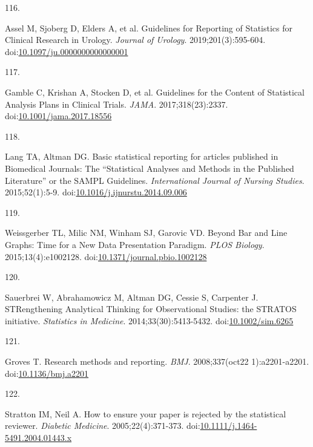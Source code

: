 \documentclass[
]{book}
\newlength{\cslhangindent}
\newlength{\csllabelwidth}
\newlength{\cslentryspacingunit} %
\newenvironment{CSLReferences}[2] %
 {%
  \setlength{\parindent}{0pt}
  \ifodd #1
  \let\oldpar\par
  \def\par{\hangindent=\cslhangindent\oldpar}
  \fi
  \setlength{\parskip}{#2\cslentryspacingunit}
 }%
 {}
\newcommand{\CSLLeftMargin}[1]{\parbox[t]{\csllabelwidth}{#1}}
\newcommand{\CSLRightInline}[1]{\parbox[t]{\linewidth - \csllabelwidth}{#1}\break}
\begin{document}
\begin{CSLReferences}{0}{0}
\leavevmode{}%
\CSLLeftMargin{116. }%
\CSLRightInline{Assel M, Sjoberg D, Elders A, et al. Guidelines for Reporting of Statistics for Clinical Research in Urology. \emph{Journal of Urology}. 2019;201(3):595-604. doi:\href{https://doi.org/10.1097/ju.0000000000000001}{10.1097/ju.0000000000000001}}

\leavevmode{}%
\CSLLeftMargin{117. }%
\CSLRightInline{Gamble C, Krishan A, Stocken D, et al. Guidelines for the Content of Statistical Analysis Plans in Clinical Trials. \emph{JAMA}. 2017;318(23):2337. doi:\href{https://doi.org/10.1001/jama.2017.18556}{10.1001/jama.2017.18556}}

\leavevmode{}%
\CSLLeftMargin{118. }%
\CSLRightInline{Lang TA, Altman DG. Basic statistical reporting for articles published in Biomedical Journals: The {``}Statistical Analyses and Methods in the Published Literature{''} or the SAMPL Guidelines. \emph{International Journal of Nursing Studies}. 2015;52(1):5-9. doi:\href{https://doi.org/10.1016/j.ijnurstu.2014.09.006}{10.1016/j.ijnurstu.2014.09.006}}

\leavevmode{}%
\CSLLeftMargin{119. }%
\CSLRightInline{Weissgerber TL, Milic NM, Winham SJ, Garovic VD. Beyond Bar and Line Graphs: Time for a New Data Presentation Paradigm. \emph{PLOS Biology}. 2015;13(4):e1002128. doi:\href{https://doi.org/10.1371/journal.pbio.1002128}{10.1371/journal.pbio.1002128}}

\leavevmode{}%
\CSLLeftMargin{120. }%
\CSLRightInline{Sauerbrei W, Abrahamowicz M, Altman DG, Cessie S, Carpenter J. STRengthening Analytical Thinking for Observational Studies: the STRATOS initiative. \emph{Statistics in Medicine}. 2014;33(30):5413-5432. doi:\href{https://doi.org/10.1002/sim.6265}{10.1002/sim.6265}}

\leavevmode{}%
\CSLLeftMargin{121. }%
\CSLRightInline{Groves T. Research methods and reporting. \emph{BMJ}. 2008;337(oct22 1):a2201-a2201. doi:\href{https://doi.org/10.1136/bmj.a2201}{10.1136/bmj.a2201}}

\leavevmode{}%
\CSLLeftMargin{122. }%
\CSLRightInline{Stratton IM, Neil A. How to ensure your paper is rejected by the statistical reviewer. \emph{Diabetic Medicine}. 2005;22(4):371-373. doi:\href{https://doi.org/10.1111/j.1464-5491.2004.01443.x}{10.1111/j.1464-5491.2004.01443.x}}


\end{CSLReferences}
\end{document}
